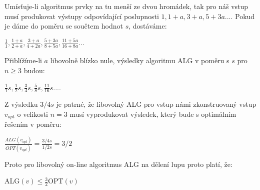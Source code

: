 \documentclass[a4paper, 12pt]{article}
\begin{document}
  Umísťuje-li algoritmus prvky na tu menší ze dvou hromádek, tak pro náš vstup musí produkovat výstupy odpovídající poslupnosti $1, 1+a, 3+a, 5+3a...$. Pokud je dáme do poměru se součtem hodnot $s$, dostáváme:

  \begin{center}
    $\frac{1}{1}, \frac{1+a}{2+a}, \frac{3+a}{4+2a}, \frac{5+3a}{8+5a}, \frac{11+5a}{16+8a}...$
  \end{center}

  Přiblížíme-li $a$ libovolně blízko nule, výsledky algoritmu ALG v poměru s $s$ pro $n \ge 3$ budou:

  \begin{center}
    $\frac{1}{1}s, \frac{1}{2}s, \frac{3}{4}s, \frac{5}{8}s, \frac{11}{16}s...$.
  \end{center}

  Z výsledku $3/4s$ je patrné, že libovolný ALG pro vstup námi zkonstruovaný vstup $v_{opt}$ o velikosti $n=3$ musí vyprodukovat výsledek, který bude s optimálním řešením v poměru:
  \begin{center}
    $\frac{ALG(v_{opt})}{OPT(v_{opt})}=\frac{3/4s}{1/2s}=3/2$
  \end{center}

  Proto pro libovolný on-line algoritmus ALG na dělení lupu proto platí, že:
  \begin{center}
    ALG$(v) \le \frac{3}{2}$OPT$(v)$
  \end{center}
\end{document}
